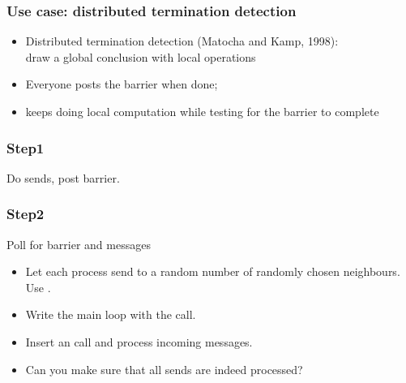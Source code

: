 \begin{frame}\frametitle{Use case: distributed termination detection}
  \begin{itemize}
  \item Distributed termination detection (Matocha and Kamp, 1998):\\
    draw a global conclusion with local operations
  \item Everyone posts the barrier when done;
  \item keeps doing local computation while testing for the barrier to
    complete
  \end{itemize}
\end{frame}


\begin{frame}[containsverbatim]\frametitle{Step1}
  Do sends, post barrier.
\end{frame}

\begin{frame}[containsverbatim]\frametitle{Step2}
  Poll for barrier and messages
\end{frame}

\begin{exerciseframe}[ibarrierupdate]
  \begin{itemize}
  \item Let each process send to a random number of randomly chosen
    neighbours. Use .
  \item Write the main loop with the  call.
  \item Insert an  call and process incoming messages.
  \item Can you make sure that all sends are indeed processed?
  \end{itemize}
\end{exerciseframe}

\begin{comment}
  \begin{frame}[containsverbatim]\frametitle{Problem with `progress'}
    \begin{itemize}
    \item Problem: \indexmpishow{MPI_Test} is local
    \item Something needs to force the barrier information to propagate
    \item Solution: force progress with \indexmpishow{MPI_Iprobe}
    \item Frowny face: barrier completion takes much longer than you'd expect.
    \end{itemize}
  \end{frame}
\end{comment}

\endinput

\begin{frame}[containsverbatim]\frametitle{}
\begin{lstlisting}
  
\end{lstlisting}
\end{frame}


